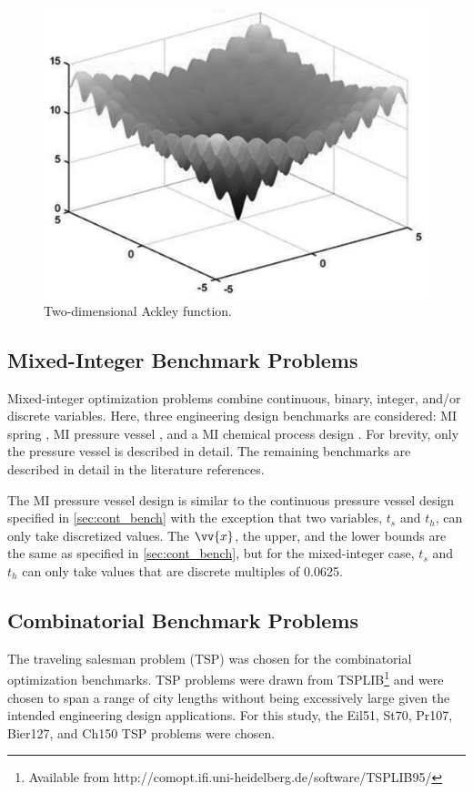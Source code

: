 \documentclass{article}                                                                           %
\begin{document}
\begin{figure}[!t]
  \centering
  \includegraphics[width=4.5in]{../figs/Ackley}
  \caption{Two-dimensional Ackley function.}
  \label{fig:Ackley}
\end{figure}

\subsection{Mixed-Integer Benchmark Problems} \label{sec:mi_bench}
Mixed-integer optimization problems combine continuous, binary, integer, and/or discrete variables.
Here, three engineering design benchmarks are considered: MI spring \cite{Lampinen1999}, MI pressure vessel \cite{Cagnina2008}, and a MI chemical process design \cite{Yiqing2007}.
For brevity, only the pressure vessel is described in detail.
The remaining benchmarks are described in detail in the literature references.

The MI pressure vessel design is similar to the continuous pressure vessel design specified in \autoref{sec:cont_bench} with the exception that two variables, $t_s$ and $t_h$, can only take discretized values.
The $\vv{x}$, the upper, and the lower bounds are the same as specified in \autoref{sec:cont_bench}, but for the mixed-integer case, $t_s$ and $t_h$ can only take values that are discrete multiples of 0.0625.

\subsection{Combinatorial Benchmark Problems} \label{sec:comb_bench}
The traveling salesman problem (TSP) was chosen for the combinatorial optimization benchmarks. 
TSP problems were drawn from TSPLIB\footnote{Available from http://comopt.ifi.uni-heidelberg.de/software/TSPLIB95/} and were chosen to span a range of city lengths without being excessively large given the intended engineering design applications.  
For this study, the Eil51, St70, Pr107, Bier127, and Ch150 TSP problems were chosen. 
\end{document}
